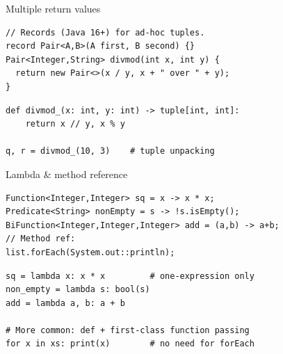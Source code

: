 \documentclass[10pt]{article}
\begin{document}
\begin{construct}{Multiple return values}
\noindent
\begin{minipage}[t]{0.485\linewidth}
\begin{lstlisting}[style=java, title=Java]
// Records (Java 16+) for ad-hoc tuples.
record Pair<A,B>(A first, B second) {}
Pair<Integer,String> divmod(int x, int y) {
  return new Pair<>(x / y, x + " over " + y);
}
\end{lstlisting}
\end{minipage}\hfill
\begin{minipage}[t]{0.485\linewidth}
\begin{lstlisting}[style=python, title=Python]
def divmod_(x: int, y: int) -> tuple[int, int]:
    return x // y, x % y

q, r = divmod_(10, 3)    # tuple unpacking
\end{lstlisting}
\end{minipage}
\end{construct}


\begin{construct}{Lambda \& method reference}
\noindent
\begin{minipage}[t]{0.485\linewidth}
\begin{lstlisting}[style=java, title=Java]
Function<Integer,Integer> sq = x -> x * x;
Predicate<String> nonEmpty = s -> !s.isEmpty();
BiFunction<Integer,Integer,Integer> add = (a,b) -> a+b;
// Method ref:
list.forEach(System.out::println);
\end{lstlisting}
\end{minipage}\hfill
\begin{minipage}[t]{0.485\linewidth}
\begin{lstlisting}[style=python, title=Python]
sq = lambda x: x * x         # one-expression only
non_empty = lambda s: bool(s)
add = lambda a, b: a + b

# More common: def + first-class function passing
for x in xs: print(x)        # no need for forEach
\end{lstlisting}
\end{minipage}
\end{construct}
\end{document}
